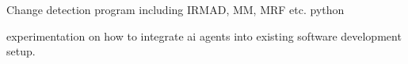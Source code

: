 
  
\divider

   Change detection program including IRMAD, MM, MRF etc.
python
\divider

experimentation on how to integrate ai agents into existing software development setup.

    
